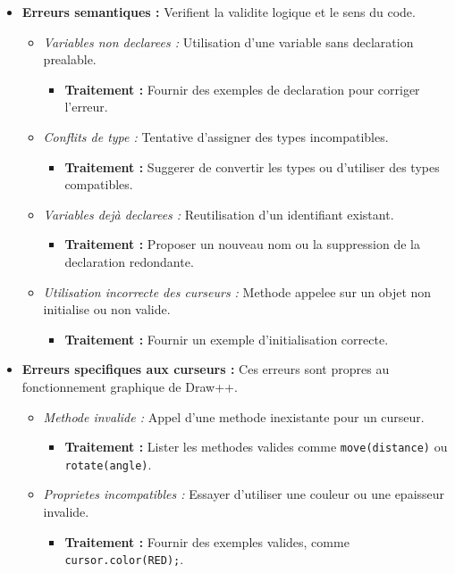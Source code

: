 \documentclass[12pt,a4paper]{report}
\begin{document}
\begin{itemize}
    \item \textbf{Erreurs semantiques :} Verifient la validite logique et le sens du code.
    \begin{itemize}
        \item \textit{Variables non declarees :} Utilisation d'une variable sans declaration prealable.
        \begin{itemize}
            \item \textbf{Traitement :} Fournir des exemples de declaration pour corriger l'erreur.
        \end{itemize}
        \item \textit{Conflits de type :} Tentative d'assigner des types incompatibles.
        \begin{itemize}
            \item \textbf{Traitement :} Suggerer de convertir les types ou d'utiliser des types compatibles.
        \end{itemize}
        \item \textit{Variables dejà declarees :} Reutilisation d'un identifiant existant.
        \begin{itemize}
            \item \textbf{Traitement :} Proposer un nouveau nom ou la suppression de la declaration redondante.
        \end{itemize}
        \item \textit{Utilisation incorrecte des curseurs :} Methode appelee sur un objet non initialise ou non valide.
        \begin{itemize}
            \item \textbf{Traitement :} Fournir un exemple d'initialisation correcte.\\
        \end{itemize}
    \end{itemize}

    \item \textbf{Erreurs specifiques aux curseurs :} Ces erreurs sont propres au fonctionnement graphique de Draw++.
    \begin{itemize}
        \item \textit{Methode invalide :} Appel d'une methode inexistante pour un curseur.
        \begin{itemize}
            \item \textbf{Traitement :} Lister les methodes valides comme \texttt{move(distance)} ou \texttt{rotate(angle)}.
        \end{itemize}
        \item \textit{Proprietes incompatibles :} Essayer d'utiliser une couleur ou une epaisseur invalide.
        \begin{itemize}
            \item \textbf{Traitement :} Fournir des exemples valides, comme \texttt{cursor.color(RED);}.
        \end{itemize}
    \end{itemize}
\end{itemize}
\end{document}
